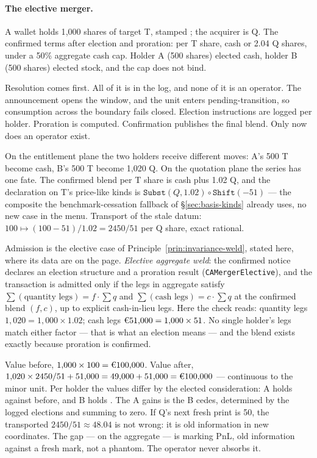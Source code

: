 \paragraph{The elective merger.} A wallet holds 1{,}000 shares of target T,
stamped ; the acquirer is Q. The confirmed terms after election and
proration: per T share,  cash or 2.04 Q shares, under a 50\%
aggregate cash cap. Holder A (500 shares) elected cash, holder B (500 shares)
elected stock, and the cap does not bind.

Resolution comes first. All of it is in the log, and none of it is an
operator. The announcement opens the window, and the unit enters
pending-transition, so consumption across the boundary fails closed.
Election instructions are logged per holder. Proration is computed.
Confirmation publishes the final blend. Only now does an operator exist.

On the entitlement plane the two holders receive different moves: A's 500 T
become  cash, B's 500 T become 1{,}020 Q. On the quotation
plane the series has one fate. The confirmed blend per T share is 
cash plus 1.02 Q, and the declaration on T's price-like kinds is
$\texttt{Subst}(Q,1.02)\circ\texttt{Shift}(-51)$ --- the composite the
benchmark-cessation fallback of \S\ref{sec:basis-kinds} already uses, no new
case in the menu. Transport of the stale datum:
$100\mapsto(100-51)/1.02=2450/51$ per Q share, exact rational.

Admission is the elective case of Principle~\ref{prin:invariance-weld},
stated here, where its data are on the page. \emph{Elective aggregate weld}:
the confirmed notice declares an election structure and a proration result
(\texttt{CAMergerElective}), and the transaction is admitted only if the legs
in aggregate satisfy $\sum(\text{quantity legs})=f\cdot\sum q$ and
$\sum(\text{cash legs})=c\cdot\sum q$ at the confirmed blend $(f,c)$, up to
explicit cash-in-lieu legs. Here the check reads: quantity legs
$1{,}020=1{,}000\times1.02$; cash legs $\EUR{51{,}000}=1{,}000\times51$. No
single holder's legs match either factor --- that is what an election means
--- and the blend exists exactly because proration is confirmed.

Value before, $1{,}000\times100=\EUR{100{,}000}$. Value after,
$1{,}020\times2450/51+51{,}000=49{,}000+51{,}000=\EUR{100{,}000}$ ---
continuous to the minor unit. Per holder the values differ by the elected
consideration: A holds  against  before, and B
holds . The  A gains is the  B cedes,
determined by the logged elections and summing to zero. If Q's next fresh
print is 50, the transported $2450/51\approx48.04$ is not wrong: it is old
information in new coordinates. The gap ---  on the
 aggregate --- is marking PnL, old information against a fresh
mark, not a phantom. The operator never absorbs it.

